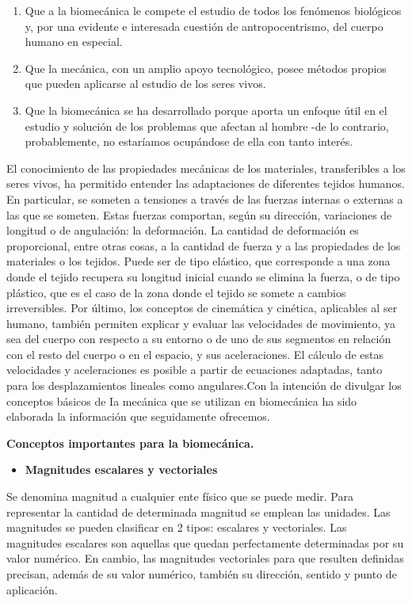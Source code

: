 \documentclass{article}
\begin{document}
\begin{enumerate}
\item  Que a la biomecánica le compete el estudio de todos los fenómenos biológicos y, por una evidente e interesada cuestión de antropocentrismo, del cuerpo humano en especial.
\item  Que la mecánica, con un amplio apoyo tecnológico, posee métodos propios que pueden aplicarse al estudio de los seres vivos. 
\item  Que la biomecánica se ha desarrollado porque aporta un enfoque útil en el estudio y solución de los problemas que afectan al hombre -de lo contrario, probablemente, no estaríamos ocupándose de ella con tanto interés.
\end{enumerate}
El conocimiento de las propiedades mecánicas de los materiales, transferibles a los seres vivos, ha permitido entender las adaptaciones de diferentes tejidos humanos. En particular, se someten a tensiones a través de las fuerzas internas o externas a las que se someten. Estas fuerzas comportan, según su dirección, variaciones de longitud o de angulación: la deformación. La cantidad de deformación es proporcional, entre otras cosas, a la cantidad de fuerza y a las propiedades de los materiales o los tejidos. Puede ser de tipo elástico, que corresponde a una zona donde el tejido recupera su longitud inicial cuando se elimina la fuerza, o de tipo plástico, que es el caso de la zona donde el tejido se somete a cambios irreversibles. Por último, los conceptos de cinemática y cinética, aplicables al ser humano, también permiten explicar y evaluar las velocidades de movimiento, ya sea del cuerpo con respecto a su entorno o de uno de sus segmentos en relación con el resto del cuerpo o en el espacio, y sus aceleraciones. El cálculo de estas velocidades y aceleraciones es posible a partir de ecuaciones adaptadas, tanto para los desplazamientos lineales como angulares.Con la intención de divulgar los conceptos básicos de Ia mecánica que se utilizan en biomecánica ha sido elaborada la información que seguidamente ofrecemos. 


\textbf{Conceptos importantes para la biomecánica.}

\begin{itemize}
\item \textbf{Magnitudes escalares y vectoriales }
\end{itemize}

Se denomina magnitud a cualquier ente físico que se puede medir. Para representar la cantidad de determinada magnitud se emplean las unidades.
Las magnitudes se pueden clasificar en 2 tipos: escalares y vectoriales. Las magnitudes escalares son aquellas que quedan perfectamente determinadas por su valor numérico. En cambio, las magnitudes vectoriales para que resulten definidas precisan, además de su valor numérico, también su dirección, sentido y punto de aplicación.
\end{document}
